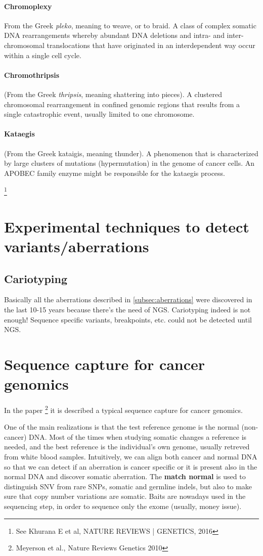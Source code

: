 			\paragraph{Chromoplexy}
			From the Greek \textit{pleko}, meaning to weave, or to braid.
A class of complex somatic DNA rearrangements whereby abundant DNA deletions
and intra- and inter-chromosomal translocations that have originated in an
interdependent way occur within a single cell cycle. 

			\paragraph{Chromothripsis}
			(From the Greek \textit{thripsis}, meaning shattering into pieces).
A clustered chromosomal rearrangement in confined genomic regions that results
from a single catastrophic event, usually limited to one chromosome. 
			\paragraph{Kataegis}
			 (From the Greek kataigis, meaning thunder).
A phenomenon that is characterized by large clusters of mutations (hypermutation) in
the genome of cancer cells. An APOBEC family enzyme might be responsible for the
kataegis process.

\footnote{See  Khurana E et al, NATURE REVIEWS | GENETICS, 2016 }


\section{Experimental techniques to detect variants/aberrations}
\subsection{Cariotyping}
Basically all the aberrations described in \ref{subsec:aberrations} were discovered in the last 10-15 years because there's the need of NGS. 
Cariotyping indeed is not enough! 
Sequence specific variants, breakpoints, etc. could not be detected until NGS. 

\section{Sequence capture for cancer genomics}
In the paper \footnote{Meyerson et al., Nature Reviews Genetics 2010} it is described a typical sequence capture for cancer genomics. 

One of the main realizations is that the test reference genome is the normal (non-cancer) DNA.
Most of the times when studying somatic changes a reference is needed, and the best reference is the individual's own genome, usually retreved from white blood samples. 
Intuitively, we can align both cancer and normal DNA so that we can detect if an aberration is cancer specific or it is present also in the normal DNA and discover somatic aberration. 
The \textbf{match normal} is used to distinguish SNV from rare SNPs, somatic and germline indels, but also to make sure that copy number variations are somatic. 
Baits are nowadays used in the sequencing step, in order to sequence only the exome (usually, money issue). 

